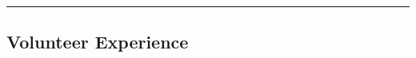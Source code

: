 \documentclass[11pt,a4paper]{article}
\makeatletter
\newcommand{\headerrow}[2]
{\begin{tabular*}{\linewidth}{l@{\extracolsep{\fill}}r}
	#1 &
	#2 \\
\end{tabular*}}
\makeatother
\begin{document}
\begin{itemize}[leftmargin=0em]
\begin{itemize*}
	
	\end{itemize*}
	
		

	
	
	
	
\end{itemize}

\vspace{.2em}
\hrule %
\vspace{-0.4em}

\subsection*{Volunteer Experience}

\vspace{-0.2em}
\end{document}

